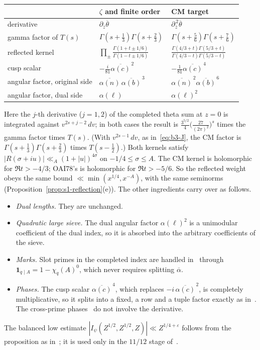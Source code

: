 \documentclass[11pt]{article}
\numberwithin{equation}{section}
\newcommand{\ind}{\mathbf1}
\begin{document}
\begin{center}
\begin{tabular}{lll}
\toprule
 & $\zeta$ and finite order~\cite{OAI78} & CM target\\\midrule
derivative & $\partial_{\bar z}\overline\theta$ & $\partial_{\bar z}^{\,2}\overline\theta$\\
gamma factor of $T(s)$ & $\Gamma(s+\frac13)\Gamma(s+\frac23)$ & $\Gamma(s+\frac56)\Gamma(s+\frac76)$\\
reflected kernel & $\prod_\pm\frac{\Gamma(1+t\pm1/6)}{\Gamma(1-t\pm1/6)}$
 & $\frac{\Gamma(4/3+t)\Gamma(5/3+t)}{\Gamma(4/3-t)\Gamma(5/3-t)}$\\
cusp scalar & $-\frac{i}{81}\overline{\alpha(c)}^{\,2}$ & $-\frac1{81}\overline{\alpha(c)}^{\,4}$\\
angular factor, original side & $\overline{\alpha(n)}\,\overline{\alpha(b)}^{\,3}$ & $\overline{\alpha(n)}^{\,2}\overline{\alpha(b)}^{\,6}$\\
angular factor, dual side & $\alpha(\ell)$ & $\alpha(\ell)^2$\\\bottomrule
\end{tabular}
\end{center}

Here the $j$-th derivative ($j=1,2$) of the completed theta sum at $z=0$ is integrated against $v^{2s+j-2}\,dv$;
in both cases the result is $\frac{3^{5/2}}4\bigl(\frac{27}{(2\pi)^2}\bigr)^s$ times the gamma factor times $T(s)$. (With
$v^{2s-1}\,dv$, as in~\eqref{eq:b3-J}, the CM factor is $\Gamma(s+\frac13)\Gamma(s+\frac23)$ times $T(s-\frac12)$.)
Both kernels satisfy $|R(\sigma+iu)|\ll_A(1+|u|)^{4\sigma}$ on $-1/4\le\sigma\le A$. The CM kernel is
holomorphic for $\Re t>-4/3$; OAI78's is holomorphic for $\Re t>-5/6$. So the reflected weight obeys
the same bound $\ll\min(x^{1/4},x^{-A})$, with the same seminorms
(Proposition~\ref{prop:s1-reflection}(e)). The other ingredients
carry over as follows.
\begin{itemize}
\item \emph{Dual lengths.} They are unchanged.
\item \emph{Quadratic large sieve.} The dual angular factor $\alpha(\ell)^2$ is a unimodular
 coefficient of the dual index, so it is absorbed into the arbitrary coefficients of the
 sieve.
\item \emph{Marks.} Slot primes in the completed index are handled in~\cite{OAI78} through
 $\ind_{q\mid A}=1-\chi_q(A)^0$, which never requires splitting $\overline\alpha$.
\item \emph{Phases.} The cusp scalar $\overline{\alpha(c)}^{\,4}$, which replaces $-i\,\overline{\alpha(c)}^{\,2}$, is completely
 multiplicative, so it splits into a fixed, a row and a tuple factor exactly as in~\cite[Section~14.2]{OAI78}. The
 cross-prime phases~\cite[proof of Proposition~5.1, \emph{The reflected additive phase}]{OAI78} do not involve the derivative.
\end{itemize}
The balanced low estimate $|I_\psi(Z^{1/2},Z^{1/2},Z)|\ll Z^{1/4+\varepsilon}$ follows from the
proposition as in~\cite{OAI78}; it is used only in the $11/12$ stage of~\cite{OAI78}.
\end{document}
